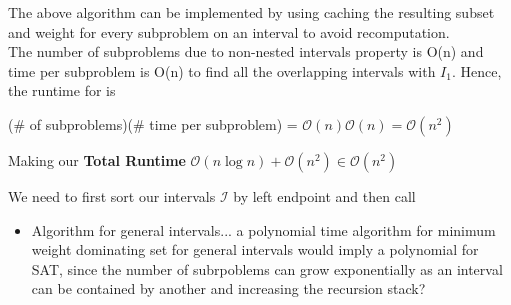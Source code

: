 \documentclass{article}
\begin{document}
\begin{solution}
\begin{subproof}[Algorithm]
\begin{quote}
\begin{steps}
\begin{steps}
    \end{steps}

\end{steps}
\end{quote}
\end{subproof}
\begin{subproof}

The above algorithm can be implemented by using caching the resulting subset and weight for every subproblem on an interval  to avoid recomputation.\\
The number of subproblems due to non-nested intervals property is O(n) and time per subproblem is O(n) to find all the overlapping intervals with $I_1$. Hence, the runtime for  is \begin{center}
    (\# of subproblems)(\# time per subproblem) = $\mathcal{O}(n)\mathcal{O}(n) = \mathcal{O}(n^2)$
\end{center}
Making our \textbf{Total Runtime} \(\mathcal{O}(n\log n) + \mathcal{O}(n^2) \in \mathcal{O}(n^2)\)

\end{subproof}
\begin{subproof} We need to first sort our intervals $\mathcal{I}$ by left endpoint and then call  

\end{subproof}
\begin{itemize}
    \item \begin{solution}
    Algorithm for general intervals... a polynomial time algorithm for minimum weight dominating set for general intervals would imply a polynomial for SAT, since the number of subrpoblems can grow exponentially as an interval can be contained by another and increasing the recursion stack?
\end{solution}
\end{itemize}

\end{solution}
\pagebreak
\end{document}
